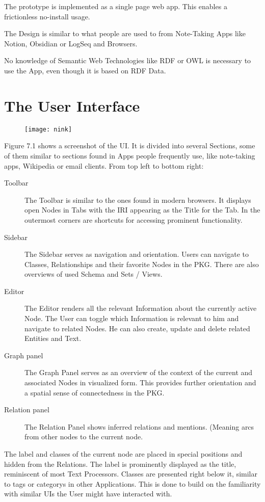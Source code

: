 The prototype is implemented as a single page web app. This enables a frictionless no-install usage.

The Design is similar to what people are used to from Note-Taking Apps like Notion, Obsidian or LogSeq and Browsers.

No knowledge of Semantic Web Technologies like RDF or OWL is necessary to use the App, even though it is based on RDF Data.

\section{The User Interface} 

\begin{figure}[H]
    \texttt{[image: nink]}
\end{figure}

Figure 7.1 shows a screenshot of the UI. It is divided into several Sections, some of them similar to sections found in Apps people frequently use, like note-taking apps, Wikipedia or email clients. From top left to bottom right:
\begin{description}
    \item[Toolbar] The Toolbar is similar to the ones found in modern browsers. It displays open Nodes in Tabs with the IRI appearing as the Title for the Tab. In the outermost corners are shortcuts for accessing prominent functionality.
    \item[Sidebar] The Sidebar serves as navigation and orientation. Users can navigate to Classes, Relationships and their favorite Nodes in the PKG. There are also overviews of used Schema and Sets / Views.
    \item[Editor] The Editor renders all the relevant Information about the currently active Node. The User can toggle which Information is relevant to him and navigate to related Nodes. He can also create, update and delete related Entities and Text.
    \item[Graph panel] The Graph Panel serves as an overview of the context of the current and associated Nodes in visualized form. This provides further orientation and a spatial sense of connectedness in the PKG.
    \item[Relation panel] The Relation Panel shows inferred relations and mentions. (Meaning arcs from other nodes to the current node.
\end{description}

The label and classes of the current node are placed in special positions and hidden from the Relations. The label is prominently displayed as the title, reminiscent of most Text Processors. Classes are presented right below it, similar to tags or categorys in other Applications. This is done to build on the familiarity with similar UIs the User might have interacted with.
    
